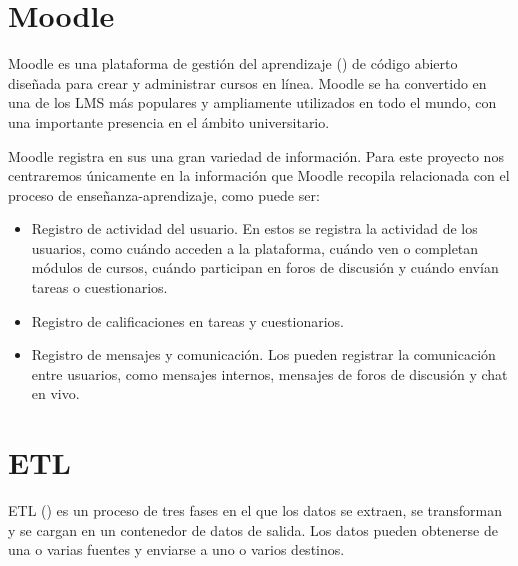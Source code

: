 \section{Moodle}

Moodle es una plataforma de gestión del aprendizaje () de código abierto diseñada
 para crear y administrar cursos en línea. Moodle se ha convertido en una de los LMS más populares y ampliamente 
 utilizados en todo el mundo, con una importante presencia en el ámbito universitario.
\

Moodle registra en sus  una gran variedad de información. Para este proyecto nos centraremos únicamente en 
la información que Moodle recopila relacionada con el proceso de enseñanza-aprendizaje, como puede ser: 

\begin{itemize}
  \item Registro de actividad del usuario. En estos  se registra la actividad de los usuarios, como cuándo 
  acceden a la plataforma, cuándo ven o completan módulos de cursos, cuándo participan en foros de discusión y
   cuándo envían tareas o cuestionarios. 
  \item Registro de calificaciones en tareas y cuestionarios.
  \item Registro de mensajes y comunicación. Los  pueden registrar la comunicación entre usuarios, 
  como mensajes internos, mensajes de foros de discusión y chat en vivo.
\end{itemize}



\section{ETL}

ETL () \cite{etl} es un proceso de tres fases en el que los datos se extraen, se transforman y se cargan en un 
contenedor de datos de salida. Los datos pueden obtenerse de una o varias fuentes y enviarse a uno o varios destinos.

